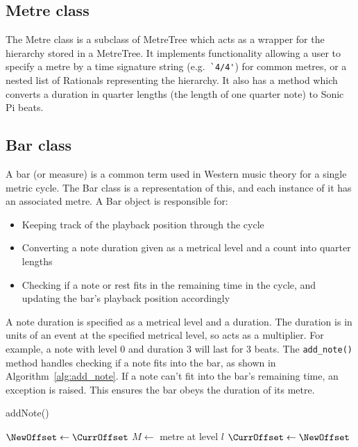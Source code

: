 \documentclass[12pt,twoside,openright]{report}
\begin{document}
\subsection{Metre class} \label{metre_class}

The Metre class is a subclass of MetreTree which acts as a wrapper for the
hierarchy stored in a MetreTree. It implements functionality allowing a user to
specify a metre by a time signature string (e.g.\ \verb|`4/4'|) for common metres, or a
nested list of Rationals representing the hierarchy. It also has a method which
converts a duration in quarter lengths (the length of one quarter note) to Sonic
Pi beats.


\subsection{Bar class} \label{bar_class}

A bar (or measure) is a common term used in Western music theory for a single
metric cycle. The Bar class is a representation of this, and each instance of it
has an associated metre. A Bar object is responsible for:
\begin{itemize}
	\item Keeping track of the playback position through the cycle
	\item Converting a note duration given as a metrical level and a count into
quarter lengths
	\item Checking if a note or rest fits in the remaining time in the cycle, and
updating the bar's playback position accordingly
\end{itemize}

A note duration is specified as a metrical level and a duration. The duration
is in units of an event at the specified metrical level, so acts as a multiplier.
For example, a note with level 0 and duration 3 will last for 3 beats. The
\verb'add_note()' method handles checking if a note fits into the bar, as shown in
Algorithm~\ref{alg:add_note}. If a note can't fit into the bar's remaining time,
an exception is raised. This ensures the bar obeys the duration of its metre.

\begin{algorithm}

    \caption{addNote()}
    \BlankLine

    $\NewOffset \gets \CurrOffset$\;
    $M \gets$ metre at level $l$\;
    $\CurrOffset \gets \NewOffset$\;
    \label{alg:add_note}
\end{algorithm}
\end{document}
